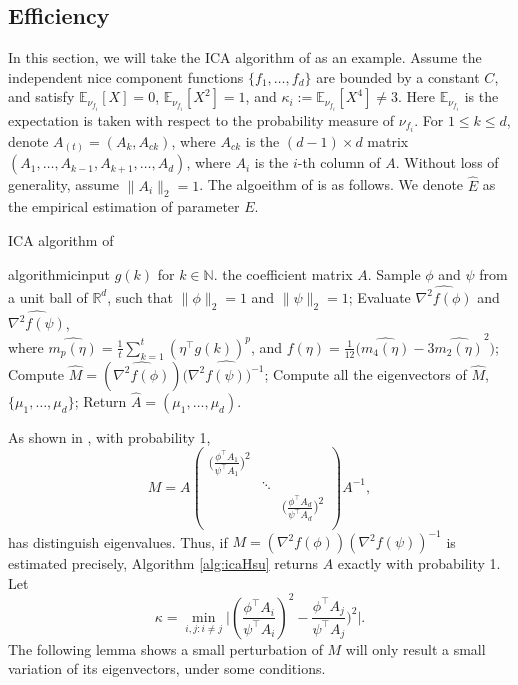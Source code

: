 \documentclass[english]{article} %
\newcommand{\E}{\mathbb{E}}
\newcommand{\real}{\mathbb{R}}
\renewcommand{\natural}{\mathbb{N}}
\theoremstyle{definition}
\begin{document}
\subsection{Efficiency}
In this section, we will take the ICA algorithm of \citet{DHsu2012} as an example. 
Assume the independent nice component functions $\{f_1,\ldots,f_d\}$ are bounded by a constant $C$, and satisfy $\E_{\nu_{f_i}}[X]=0$, $\E_{\nu_{f_i}}[X^2]=1$, and $\kappa_i := \E_{\nu_{f_i}}[X^4]\neq 3$. 
Here $\E_{\nu_{f_i}}$ is the expectation is taken with respect to the probability measure of $\nu_{f_i}$. 
For $1\le k\le d$, denote $A_{(t)} = (A_k,A_{ck})$, where $A_{ck}$ is the $(d-1)\times d$ matrix $(A_1,\ldots,A_{k-1},A_{k+1},\ldots,A_d)$, where $A_i$ is the $i$-th column of $A$. 
Without loss of generality, assume $\|A_i\|_2=1$.
The algoeithm of \citet{DHsu2012} is as follows. We denote $\widehat{E}$ as the empirical estimation of parameter $E$. 
\begin{algorithm}[H]
\caption{ICA algorithm of \citet{DHsu2012} \label{alg:icaHsu}}
\begin{algorithmic}[1]
\INPUT algorithmicinput $g(k)$ for $k\in\natural$.
\OUTPUT the coefficient matrix $A$. 
\STATE Sample $\phi$ and $\psi$ from a unit ball of $\real^d$, such that $\|\phi\|_2 = 1$ and $\|\psi\|_2 = 1$;
\STATE Evaluate $\widehat{\nabla^2f(\phi)}$ and $\widehat{\nabla^2f(\psi)}$, \\
\quad where $\widehat{m_p(\eta)} = \frac{1}{t}\sum_{k=1}^{t} (\eta^{\top}g(k))^p$, and $f(\eta) = \frac{1}{12}\big(\widehat{m_4(\eta)} - 3\widehat{m_2(\eta)}^2 \big)$;
\STATE Compute $\widehat{M} = (\widehat{\nabla^2f(\phi)})(\widehat{\nabla^2f(\psi))^{-1}}$;
\STATE Compute all the eigenvectors of $\widehat{M}$, $\{\mu_1,\ldots,\mu_d\}$;
\STATE Return $\widehat{A} = (\mu_1,\ldots,\mu_d)$.
\end{algorithmic}
\end{algorithm}

As shown in \citep{DHsu2012}, with probability 1,
\begin{equation}
\label{eq:M}
M = A 
\left(
\begin{array}{ccc}
\big(\frac{\phi^{\top}A_1}{\psi^{\top}A_1}\big)^2 & &\\
    & \ddots & \\
    & & \big(\frac{\phi^{\top}A_d}{\psi^{\top}A_d}\big)^2\\
\end{array} 
\right) 
A^{-1},
\end{equation}
has distinguish eigenvalues. Thus, if $M =(\nabla^2f(\phi))(\nabla^2f(\psi))^{-1} $ is estimated precisely, Algorithm \ref{alg:icaHsu} returns $A$ exactly  with probability 1. 
Let 
\begin{equation}
\label{def:kappa}
\kappa =  \min_{i,j: i\neq j} \vert (\frac{\phi^{\top}A_i}{\psi^{\top}A_i})^2 - \frac{\phi^{\top}A_j}{\psi^{\top}A_j})^2 \vert. 
\end{equation}
The following lemma shows a small perturbation of $M$ will only result a small variation of its eigenvectors, under some conditions.
\end{document}
